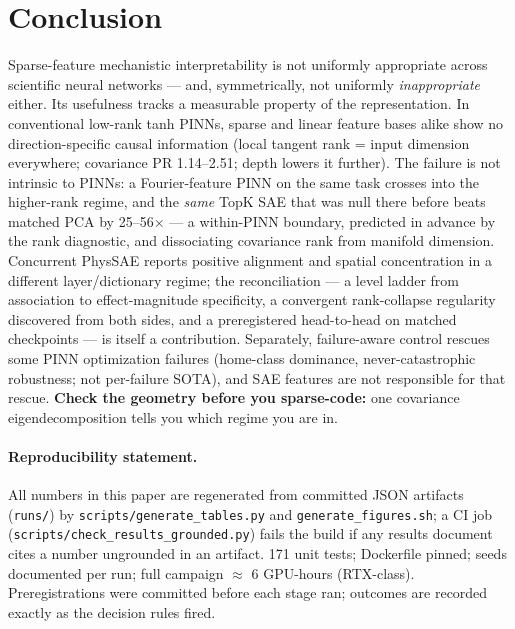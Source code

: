 \documentclass{article}
\begin{document}
\section{Conclusion}
\label{sec:conclusion}

Sparse-feature mechanistic interpretability is not uniformly appropriate
across scientific neural networks --- and, symmetrically, not uniformly
\emph{inappropriate} either. Its usefulness tracks a measurable property
of the representation. In conventional low-rank tanh PINNs, sparse and
linear feature bases alike show no direction-specific causal information
(local tangent rank = input dimension everywhere; covariance PR
1.14--2.51; depth lowers it further). The failure is not intrinsic to
PINNs: a Fourier-feature PINN on the same task crosses into the
higher-rank regime, and the \emph{same} TopK SAE that was null there
before beats matched PCA by 25--56$\times$ --- a within-PINN boundary,
predicted in advance by the rank diagnostic, and dissociating
covariance rank from manifold dimension. Concurrent PhysSAE
\cite{patil2026physSAE} reports positive alignment and spatial
concentration in a different layer/dictionary regime; the reconciliation
--- a level ladder from association to effect-magnitude specificity, a
convergent rank-collapse regularity discovered from both sides, and a
preregistered head-to-head on matched checkpoints --- is itself a
contribution. Separately, failure-aware control rescues some PINN
optimization failures (home-class dominance, never-catastrophic
robustness; not per-failure SOTA), and SAE features are not responsible
for that rescue. \textbf{Check the geometry before you sparse-code:}
one covariance eigendecomposition tells you which regime you are in.

\paragraph{Reproducibility statement.} All numbers in this paper are
regenerated from committed JSON artifacts (\texttt{runs/}) by
\texttt{scripts/generate\_tables.py} and \texttt{generate\_figures.sh}; a
CI job (\texttt{scripts/check\_results\_grounded.py}) fails the build if
any results document cites a number ungrounded in an artifact. 171 unit
tests; Dockerfile pinned; seeds documented per run; full campaign
$\approx$ 6 GPU-hours (RTX-class). Preregistrations were committed before
each stage ran; outcomes are recorded exactly as the decision rules fired.



\end{document}
